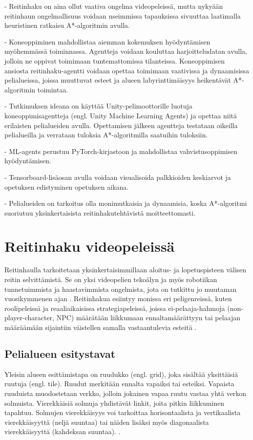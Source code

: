 \documentclass[utf8]{gradu3}
\begin{document}
- Reitinhaku on aina ollut vaativa ongelma videopeleissä, mutta nykyään reitinhaun ongelmallisuus voidaan
useimmissa tapauksissa sivuuttaa laatimalla heuristinen ratkaisu A*-algoritmin avulla.

- Koneoppiminen mahdollistaa aiemman kokemuksen hyödyntämisen myöhemmässä toiminnassa.
Agentteja voidaan kouluttaa harjoitteludatan avulla, jolloin ne oppivat toimimaan tuntemattomissa tilanteissa.
Koneoppimisen ansiosta reitinhaku-agentti voidaan opettaa toimimaan vaativissa ja
dynaamisissa pelialueissa, joissa muuttuvat esteet ja alueen labyrinttimäisyys
heikentävät A*-algoritmin toimintaa.

- Tutkimuksen ideana on käyttää Unity-pelimoottorille luotuja koneoppimisagentteja (engl. Unity Machine Learning Agents)
ja opettaa niitä erilaisten pelialueiden avulla. Opettamisen jälkeen agentteja testataan oikeilla
pelialueilla ja verrataan tuloksia A*-algoritmilla saatuihin tuloksiin.

- ML-agents perustuu PyTorch-kirjastoon ja mahdollistaa vahvistusoppimisen hyödyntämisen.

- Tensorboard-lisäosan avulla voidaan visualisoida palkkioiden keskiarvot ja opetuksen edistyminen opetuksen aikana.

- Pelialueiden on tarkoitus olla monimutkaisia ja dynaamisia, koska A*-algoritmi suoriutuu
yksinkertaisista reitinhakutehtävistä moitteettomasti.

\chapter{Reitinhaku videopeleissä}

Reitinhaulla tarkoitetaan yksinkertaisimmillaan aloitus- ja lopetuspisteen välisen reitin selvittämistä. Se on yksi videopelien tekoälyn ja myös robotiikan tunnetuimmista ja haastavimmista ongelmista, jota on tutkittu jo muutaman vuosikymmenen ajan \parencite{cui2011based,abd2015comprehensive}. Reitinhakua esiintyy monissa eri peligenreissä, kuten roolipeleissä ja reaaliaikaisissa strategiapeleissä, joissa ei-pelaaja-hahmoja (non-player-character, NPC) määrätään liikkumaan ennaltamäärättyyn tai pelaajan määräämään sijaintiin väistellen samalla vastaantulevia esteitä \parencite{cui2011based}.

\section{Pelialueen esitystavat}

Yleisin alueen esittämistapa on ruudukko (engl. grid), joka sisältää yksittäisiä ruutuja (engl. tile). Ruudut merkitään ennalta vapaiksi tai esteiksi. Vapaista ruuduista muodostetaan verkko, jolloin jokainen vapaa ruutu vastaa yhtä verkon solmuista. Vierekkäisiä solmuja yhdistävät linkit, joita pitkin liikkuminen tapahtuu. Solmujen vierekkäisyys voi tarkoittaa horisontaalista ja vertikaalista vierekkäisyyttä (neljä suuntaa) tai näiden lisäksi myös diagonaalista vierekkäisyyttä (kahdeksan suuntaa). \parencite{botea2013pathfinding,abd2015comprehensive}.
\end{document}

